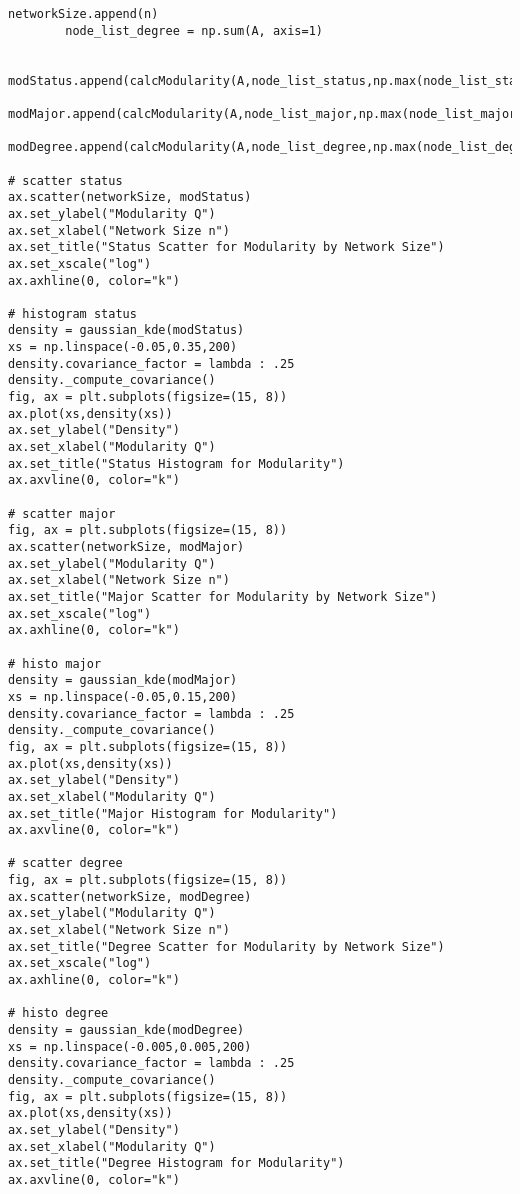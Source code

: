 \documentclass[12pt,letterpaper]{article}
\begin{document}
\begin{lstlisting}[style = Python]
        networkSize.append(n)
        node_list_degree = np.sum(A, axis=1)

        modStatus.append(calcModularity(A,node_list_status,np.max(node_list_status)+1))
        modMajor.append(calcModularity(A,node_list_major,np.max(node_list_major)+1))
        modDegree.append(calcModularity(A,node_list_degree,np.max(node_list_degree)+1))

# scatter status
ax.scatter(networkSize, modStatus)
ax.set_ylabel("Modularity Q")
ax.set_xlabel("Network Size n")
ax.set_title("Status Scatter for Modularity by Network Size")
ax.set_xscale("log")
ax.axhline(0, color="k")

# histogram status
density = gaussian_kde(modStatus)
xs = np.linspace(-0.05,0.35,200)
density.covariance_factor = lambda : .25
density._compute_covariance()
fig, ax = plt.subplots(figsize=(15, 8))
ax.plot(xs,density(xs))
ax.set_ylabel("Density")
ax.set_xlabel("Modularity Q")
ax.set_title("Status Histogram for Modularity")
ax.axvline(0, color="k")

# scatter major
fig, ax = plt.subplots(figsize=(15, 8))
ax.scatter(networkSize, modMajor)
ax.set_ylabel("Modularity Q")
ax.set_xlabel("Network Size n")
ax.set_title("Major Scatter for Modularity by Network Size")
ax.set_xscale("log")
ax.axhline(0, color="k")

# histo major
density = gaussian_kde(modMajor)
xs = np.linspace(-0.05,0.15,200)
density.covariance_factor = lambda : .25
density._compute_covariance()
fig, ax = plt.subplots(figsize=(15, 8))
ax.plot(xs,density(xs))
ax.set_ylabel("Density")
ax.set_xlabel("Modularity Q")
ax.set_title("Major Histogram for Modularity")
ax.axvline(0, color="k")

# scatter degree
fig, ax = plt.subplots(figsize=(15, 8))
ax.scatter(networkSize, modDegree)
ax.set_ylabel("Modularity Q")
ax.set_xlabel("Network Size n")
ax.set_title("Degree Scatter for Modularity by Network Size")
ax.set_xscale("log")
ax.axhline(0, color="k")

# histo degree
density = gaussian_kde(modDegree)
xs = np.linspace(-0.005,0.005,200)
density.covariance_factor = lambda : .25
density._compute_covariance()
fig, ax = plt.subplots(figsize=(15, 8))
ax.plot(xs,density(xs))
ax.set_ylabel("Density")
ax.set_xlabel("Modularity Q")
ax.set_title("Degree Histogram for Modularity")
ax.axvline(0, color="k")
\end{lstlisting}
\end{document}
